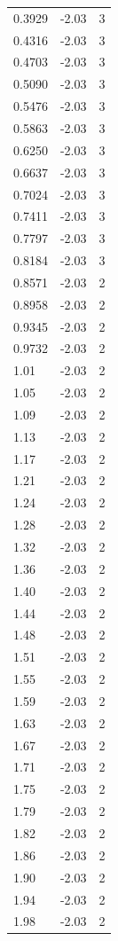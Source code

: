 \begin{longtable}{lrr}
  0.3929 & -2.03 & 3 \\
  0.4316 & -2.03 & 3 \\
  0.4703 & -2.03 & 3 \\
  0.5090 & -2.03 & 3 \\
  0.5476 & -2.03 & 3 \\
  0.5863 & -2.03 & 3 \\
  0.6250 & -2.03 & 3 \\
  0.6637 & -2.03 & 3 \\
  0.7024 & -2.03 & 3 \\
  0.7411 & -2.03 & 3 \\
  0.7797 & -2.03 & 3 \\
  0.8184 & -2.03 & 3 \\
  0.8571 & -2.03 & 2 \\
  0.8958 & -2.03 & 2 \\
  0.9345 & -2.03 & 2 \\
  0.9732 & -2.03 & 2 \\
  1.01 & -2.03 & 2 \\
  1.05 & -2.03 & 2 \\
  1.09 & -2.03 & 2 \\
  1.13 & -2.03 & 2 \\
  1.17 & -2.03 & 2 \\
  1.21 & -2.03 & 2 \\
  1.24 & -2.03 & 2 \\
  1.28 & -2.03 & 2 \\
  1.32 & -2.03 & 2 \\
  1.36 & -2.03 & 2 \\
  1.40 & -2.03 & 2 \\
  1.44 & -2.03 & 2 \\
  1.48 & -2.03 & 2 \\
  1.51 & -2.03 & 2 \\
  1.55 & -2.03 & 2 \\
  1.59 & -2.03 & 2 \\
  1.63 & -2.03 & 2 \\
  1.67 & -2.03 & 2 \\
  1.71 & -2.03 & 2 \\
  1.75 & -2.03 & 2 \\
  1.79 & -2.03 & 2 \\
  1.82 & -2.03 & 2 \\
  1.86 & -2.03 & 2 \\
  1.90 & -2.03 & 2 \\
  1.94 & -2.03 & 2 \\
  1.98 & -2.03 & 2 \\

\end{longtable}
